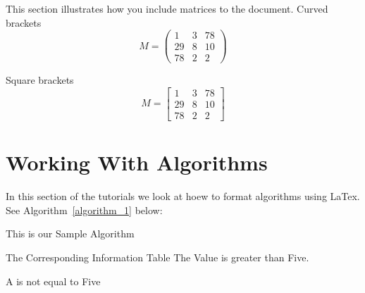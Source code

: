 \documentclass{article}
\begin{document}
	This section illustrates how you include matrices to the document.
	Curved brackets
	\[
	 M = \begin{pmatrix}
	 1 & 3 & 78 \\
	 29 & 8 & 10 \\
	 78 & 2 & 2 
	 \end{pmatrix}
	\]
	
	Square brackets
	\[
	M = \begin{bmatrix}
	1 & 3 & 78 \\
	29 & 8 & 10 \\
	78 & 2 & 2 
	\end{bmatrix}
	\]
	
	\section{Working With Algorithms}
	In this section of the tutorials we look at hoew to format algorithms using LaTex. See Algorithm~\ref{algorithm_1} below:
	
	\begin{algorithm}[htbp]
		\caption{This is our Sample Algorithm}
		\label{algorithm_1}
	\begin{algorithmic}
		\renewcommand{\algorithmicrequire}{\textbf{Input:}}
		\renewcommand{\algorithmicensure}{\textbf{Output:}}
		\ENSURE The Corresponding
		\REQUIRE Information Table
			\STATE The Value is greater than Five.
			
		\ELSE
				\STATE A is not equal to Five
			\ENDWHILE
		\ENDIF 	
	\end{algorithmic}
	\end{algorithm}
	
	
\end{document}
